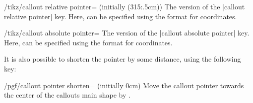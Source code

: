 \begin{key}{/tikz/callout relative pointer= (initially {(315:.5cm)})}
	The \tikzname{} version of the |callout relative pointer| key. Here,
	 can be specified using the \tikzname{} format for
	coordinates.
\end{key}

\begin{key}{/tikz/callout absolute pointer=}
	The \tikzname{} version of the |callout absolute pointer| key. Here,
	 can be specified using the \tikzname{} format for
	coordinates.
\end{key}

	It is also possible to shorten the pointer by some distance, using 
	the following key:
	
\begin{key}{/pgf/callout pointer shorten= (initially 0cm)}
	Move the callout pointer towards the center of the callouts main 
	shape by . 
	
\begin{codeexample}[]
\end{codeexample}
\end{key}
	
